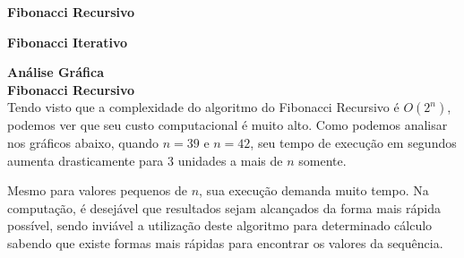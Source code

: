 \documentclass[a4paper, 12pt]{article}
\begin{document}
{\large\bf Fibonacci Recursivo}

\vspace{0.3cm}
{\large\bf\quad Fibonacci Iterativo}


\newpage

{\LARGE\bf Análise Gráfica}\\

{\Large\bf Fibonacci Recursivo}\\

Tendo visto que a complexidade do algoritmo do Fibonacci Recursivo é $O(2^n)$, podemos ver que seu custo computacional é muito alto. Como podemos analisar nos gráficos abaixo, quando $n=39$ e $n=42$, seu tempo de execução em segundos aumenta drasticamente para 3 unidades a mais de $n$ somente.

Mesmo para valores pequenos de $n$, sua execução demanda muito tempo. Na computação, é desejável que resultados sejam alcançados da forma mais rápida possível, sendo inviável a utilização deste algoritmo para determinado cálculo sabendo que existe formas mais rápidas para encontrar os valores da sequência.
\end{document}
